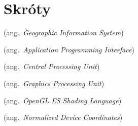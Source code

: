 \chapter*{Skróty}\mbox{}
\label{sec:skroty}
\noindent
\begin{description}[labelwidth=*]
  \item [GIS] (ang.\ \emph{Geographic Information System})
  \item [API] (ang.\ \emph{Application Programming Interface})
  \item [CPU] (ang.\ \emph{Central Processing Unit})
  \item [GPU] (ang.\ \emph{Graphics Processing Unit})
  \item [ESSL] (ang.\ \emph{OpenGL ES Shading Language})
  \item [NDC] (ang.\ \emph{Normalized Device Coordinates})
\end{description}
